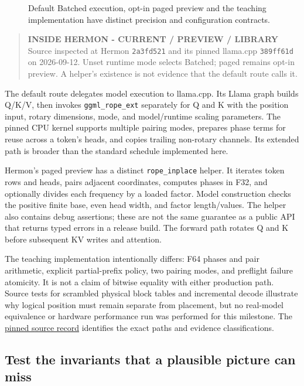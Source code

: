 \documentclass[
  10pt,
]{article}
\begin{document}
\begin{figure}[H]\centering\resizebox{\linewidth}{!}{}\caption{Default Batched execution, opt-in paged preview and the teaching implementation have distinct precision and configuration contracts.}\end{figure}

\begin{quote}
\textbf{INSIDE HERMON - CURRENT / PREVIEW / LIBRARY} Source inspected at
Hermon \texttt{2a3fd521} and its pinned llama.cpp \texttt{389ff61d} on
2026-09-12. Unset runtime mode selects Batched; paged remains opt-in
preview. A helper's existence is not evidence that the default route
calls it.
\end{quote}

The default route delegates model execution to llama.cpp. Its Llama
graph builds Q/K/V, then invokes \texttt{ggml\_rope\_ext} separately for
Q and K with the position input, rotary dimensions, mode, and
model/runtime scaling parameters. The pinned CPU kernel supports
multiple pairing modes, prepares phase terms for reuse across a token's
heads, and copies trailing non-rotary channels. Its extended path is
broader than the standard schedule implemented here.

Hermon's paged preview has a distinct \texttt{rope\_inplace} helper. It
iterates token rows and heads, pairs adjacent coordinates, computes
phases in F32, and optionally divides each frequency by a loaded factor.
Model construction checks the positive finite base, even head width, and
factor length/values. The helper also contains debug assertions; these
are not the same guarantee as a public API that returns typed errors in
a release build. The forward path rotates Q and K before subsequent KV
writes and attention.

The teaching implementation intentionally differs: F64 phases and pair
arithmetic, explicit partial-prefix policy, two pairing modes, and
preflight failure atomicity. It is not a claim of bitwise equality with
either production path. Source tests for scrambled physical block tables
and incremental decode illustrate why logical position must remain
separate from placement, but no real-model equivalence or hardware
performance run was performed for this milestone. The
\href{https://github.com/hermonai/inside-the-llm-engine/blob/astra-visual-rewrite/research/part-02/chapter-09-position-rope.md}{pinned
source record} identifies the exact paths and evidence classifications.

\subsection{Test the invariants that a plausible picture can
miss}\label{test-the-invariants-that-a-plausible-picture-can-miss}
\end{document}
